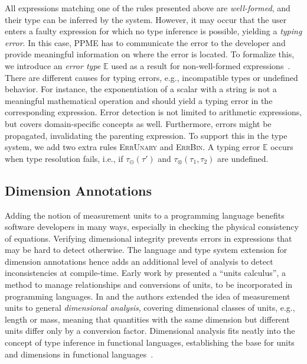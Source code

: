    All expressions matching one of the rules presented above are
    \emph{well-formed}, and their type can be inferred by the system. However, it
    may occur that the user enters a faulty expression for which no type inference is
    possible, yielding a \emph{typing error}. In this case, PPME has to communicate
    the error to the developer and provide meaningful information on where the error
    is located.
    To formalize this, we introduce an \emph{error type} $\mathbb{E}$ used as a
    result for non-well-formed expressions~\cite{Plotkin1981,Plotkin2004}.
    There are different causes for typing errors, e.g., incompatible types or
    undefined behavior. For instance, the exponentiation of a scalar with a string is
    not a meaningful mathematical operation and should yield a typing error in the
    corresponding expression. Error detection is not limited to arithmetic
    expressions, but covers domain-specific concepts as well.
    Furthermore, errors might be propagated, invalidating the parenting expression. To
    support this in the type system, we add two extra rules \textsc{ErrUnary} and
    \textsc{ErrBin}. A typing error $\mathbb{E}$ occurs when type resolution fails,
    i.e., if $\tau_\ominus(\tau')$ and $\tau_\otimes(\tau_1, \tau_2)$ are undefined.

\subsection{Dimension Annotations} %
\label{sub:dimension_annotations}

  Adding the notion of measurement units to a programming language benefits software
  developers in many ways, especially in checking the physical consistency of equations. Verifying dimensional
  integrity prevents errors in expressions that may be hard to detect
  otherwise. The language and type system extension for dimension annotations hence adds an
  additional level of analysis to detect inconsistencies at compile-time.
  Early work by \cite{Karr1978} presented a \enquote{units calculus}, a method
  to manage relationships and conversions of units, to be incorporated in programming
  languages. In \cite{Cmelik1988} and \cite{Umrigar1994} the authors
  extended the idea of measurement units to general \emph{dimensional analysis},
  covering dimensional classes of units, e.g., length or mass, meaning that
  quantities with the same dimension but different units differ only by a conversion factor.
  Dimensional analysis fits neatly into the concept of type inference in
  functional languages, establishing the base for units and dimensions in functional
  languages~\cite{Wand1991,Kennedy1994,Kennedy1997,Hayes1995}.

